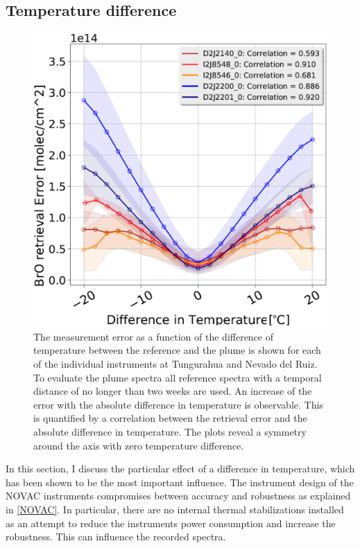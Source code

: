 \subsection{Temperature difference}
\begin{figure}
    \centering
    \includegraphics[width=0.7\linewidth]{Bilder/DiffTempallInstruments1}
    \caption[The  measurement error as a function of the difference of temperature between the reference and the plume is shown for each of the individual instruments at Tungurahua and Nevado del Ruiz.]{The  measurement error as a function of the difference of temperature between the reference and the plume is shown for each of the individual instruments at Tungurahua and Nevado del Ruiz. To evaluate the plume spectra all reference spectra with a temporal distance of no longer than two weeks are used. An increase of the  error with the absolute difference in temperature is observable. This is quantified by a correlation between the  retrieval error and the absolute difference in temperature. The plots reveal a symmetry around the axis with zero temperature difference.}
    \label{fig:difftemp}
\end{figure}
In this section, I discuss the particular effect of a difference in temperature, which has been shown to be the most important influence.
The instrument design of the NOVAC instruments compromises between accuracy and robustness as explained in \cref{NOVAC}. In particular, there are no internal thermal stabilizations installed as an attempt to reduce the instruments power consumption and increase the robustness. This can influence the recorded spectra.\\
